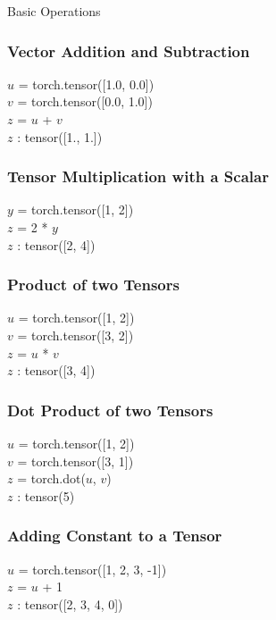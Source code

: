 \documentclass[14 pt]{beamer}
\begin{document}
\begin{frame}
\Large{Basic Operations}
\end{frame}

\begin{frame}
  \frametitle{Vector Addition and Subtraction}
  \begin{block}{}
    $u$ = torch.tensor([1.0, 0.0]) \\
    $v$ = torch.tensor([0.0, 1.0]) \\
    $z$ = $u$ + $v$ \\
    $z$ : tensor([1., 1.])
  \end{block}
\end{frame}

\begin{frame}
  \frametitle{Tensor Multiplication with a Scalar}
  \begin{block}{}
    $y$ = torch.tensor([1, 2]) \\
    $z$ = 2 * $y$ \\
    $z$ : tensor([2, 4])
  \end{block}
\end{frame}

\begin{frame}
  \frametitle{Product of two Tensors}
  \begin{block}{}
    $u$ = torch.tensor([1, 2]) \\
    $v$ = torch.tensor([3, 2])\\
    $z$ = $u$ * $v$ \\
    $z$ : tensor([3, 4])
  \end{block}
\end{frame}

\begin{frame}
  \frametitle{Dot Product of two Tensors}
  \begin{block}{}
    $u$ = torch.tensor([1, 2]) \\
    $v$ = torch.tensor([3, 1])\\
    $z$ = torch.dot($u$, $v$) \\
    $z$ : tensor(5)
  \end{block}
\end{frame}

\begin{frame}
  \frametitle{Adding Constant to a Tensor}
  \begin{block}{}
    $u$ = torch.tensor([1, 2, 3, -1]) \\
    $z$ = $u$  + 1 \\
    $z$ : tensor([2, 3, 4, 0])
  \end{block}
\end{frame}
\end{document}
